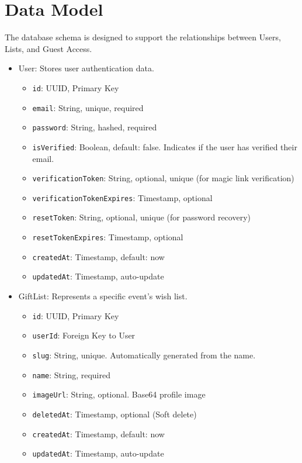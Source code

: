 \section{Data Model}
The database schema is designed to support the relationships between Users, Lists, and Guest Access.
\begin{itemize}
    \item User: Stores user authentication data.
        \begin{itemize}
            \item \texttt{id}: UUID, Primary Key
            \item \texttt{email}: String, unique, required
            \item \texttt{password}: String, hashed, required
            \item \texttt{isVerified}: Boolean, default: false. Indicates if the user has verified their email.
            \item \texttt{verificationToken}: String, optional, unique (for magic link verification)
            \item \texttt{verificationTokenExpires}: Timestamp, optional
            \item \texttt{resetToken}: String, optional, unique (for password recovery)
            \item \texttt{resetTokenExpires}: Timestamp, optional
            \item \texttt{createdAt}: Timestamp, default: now
            \item \texttt{updatedAt}: Timestamp, auto-update
        \end{itemize}
    \item GiftList: Represents a specific event's wish list.
        \begin{itemize}
            \item \texttt{id}: UUID, Primary Key
            \item \texttt{userId}: Foreign Key to User
            \item \texttt{slug}: String, unique. Automatically generated from the name.
            \item \texttt{name}: String, required
            \item \texttt{imageUrl}: String, optional. Base64 profile image
            \item \texttt{deletedAt}: Timestamp, optional (Soft delete)
            \item \texttt{createdAt}: Timestamp, default: now
            \item \texttt{updatedAt}: Timestamp, auto-update

\end{itemize}
\end{itemize}
